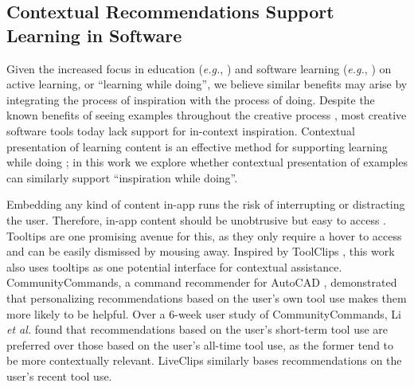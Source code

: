 \subsection{Contextual Recommendations Support Learning in Software}
Given the increased focus in education (\textit{e.g.}, \cite{Prince2004}) and software learning (\textit{e.g.}, \cite{Greene2002, Grossman2010a}) on active learning, or ``learning while doing'', we believe similar benefits may arise by integrating the process of inspiration with the process of doing. Despite the known benefits of seeing examples throughout the creative process \cite{Kulkarni2014}, most creative software tools today lack support for in-context inspiration. Contextual presentation of learning content is an effective method for supporting learning while doing \cite{Grossman2010a, Matejka2011, Ichinco2017, Matejka2009}; in this work we explore whether contextual presentation of examples can similarly support ``inspiration while doing''. 

Embedding any kind of content in-app runs the risk of interrupting or distracting the user. Therefore, in-app content should be unobtrusive but easy to access \cite{Grossman2010a}. Tooltips are one promising avenue for this, as they only require a hover to access and can be easily dismissed by mousing away. Inspired by ToolClips \cite{Grossman2010a}, this work also uses tooltips as one potential interface for contextual assistance. 
CommunityCommands, a command recommender for AutoCAD \cite{Matejka2009}, demonstrated that personalizing recommendations based on the user's own tool use makes them more likely to be helpful. Over a 6-week user study of CommunityCommands, Li \textit{et al.} \cite{Li2011} found that recommendations based on the user's short-term tool use are preferred over those based on the user's all-time tool use, as the former tend to be more contextually relevant. LiveClips similarly bases recommendations on the user's recent tool use.


